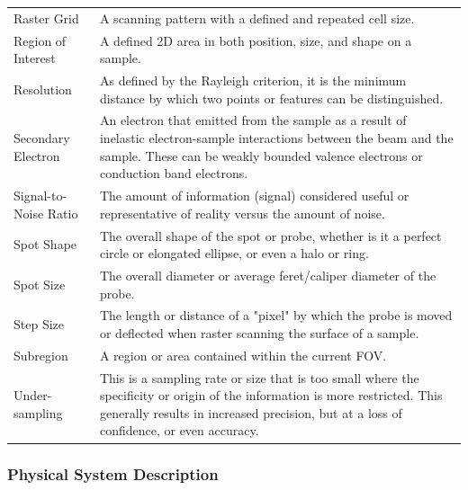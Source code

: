 \documentclass[12pt]{article}
\begin{document}
\begin{center}
\begin{longtable}{p{4.25cm} p{11.25cm}}
        Raster Grid & A scanning pattern with a defined and repeated cell size. \\
        
        Region of Interest & A defined 2D area in both position, size, and shape on a sample. \\
        
        Resolution & As defined by the Rayleigh criterion, it is the minimum distance by which two points or features can be distinguished. \\
        
        Secondary Electron & An electron that emitted from the sample as a result of inelastic electron-sample interactions between the beam and the sample. These can be weakly bounded valence electrons or conduction band electrons. \\
        
        Signal-to-Noise Ratio & The amount of information (signal) considered useful or representative of reality versus the amount of noise. \\
        
        Spot Shape & The overall shape of the spot or probe, whether is it a perfect circle or elongated ellipse, or even a halo or ring. \\
        
        Spot Size & The overall diameter or average feret/caliper diameter of the probe. \\
        
        Step Size & The length or distance of a "pixel" by which the probe is moved or deflected when raster scanning the surface of a sample. \\
        
        Subregion & A region or area contained within the current FOV. \\

        Under-sampling & This is a sampling rate or size that is too small where the specificity or origin of the information is more restricted. This generally results in increased precision, but at a loss of confidence, or even accuracy. \\
        \bottomrule
    \end{longtable} 
\end{center}


\subsubsection{Physical System Description} \label{sec_phySystDescrip}
\end{document}
